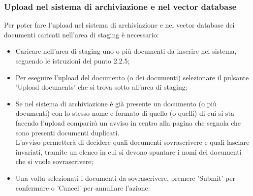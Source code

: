 \documentclass[10pt, a4paper]{article}
\begin{document}
\subsubsection{Upload nel sistema di archiviazione e nel vector database}
Per poter fare l’upload nel sistema di archiviazione e nel vector database dei documenti caricati nell’area di staging è necessario:
\begin{itemize}
    \item Caricare nell'area di staging uno o più documenti da inserire nel sistema, seguendo le istruzioni del punto 2.2.5; 
    \item Per eseguire l'upload del documento (o dei documenti) selezionare il pulsante 'Upload documents' che si trova sotto all'area di staging;
    \item Se nel sistema di archiviazione è già presente un documento (o più documenti) con lo stesso nome e formato di quello (o quelli) di cui si sta facendo l'upload comparirà un avviso in centro alla pagina che segnala che sono presenti documenti duplicati. \\L'avviso permetterà di decidere quali documenti sovrascrivere e quali lasciare invariati, tramite un elenco in cui si devono spuntare i nomi dei documenti che si vuole sovrascrivere;
    \item Una volta selezionati i documenti da sovrascrivere, premere 'Submit' per confermare o 'Cancel' per annullare l'azione.
    
    
\end{itemize}
\end{document}
